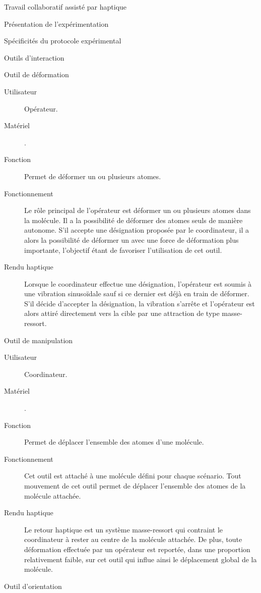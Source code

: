 \documentclass[myfrancais,ngerman,english,french]{mythesis}
\begin{document}
\begin{mychapter}{Travail collaboratif assisté par haptique}
\begin{mysection}{Présentation de l'expérimentation}
\begin{mysubsection}{Spécificités du protocole expérimental}
\begin{mysubsubsection}{Outils d'interaction}
\begin{myparagraph}{Outil de déformation}
						\begin{description}
							\item[Utilisateur] Opérateur.
							\item[Matériel] \myOmni.
							\item[Fonction] Permet de déformer un ou plusieurs atomes.
							\item[Fonctionnement]
								Le rôle principal de l'opérateur est déformer un ou plusieurs atomes dans la molécule.
								Il a la possibilité de déformer des atomes seuls de manière autonome.
								S'il accepte une désignation proposée par le coordinateur, il a alors la possibilité de déformer un  avec une force de déformation plus importante, l'objectif étant de favoriser l'utilisation de cet outil.
							\item[Rendu haptique]
								Lorsque le coordinateur effectue une désignation, l'opérateur est soumis à une vibration sinusoïdale sauf si ce dernier est déjà en train de déformer.
								S'il décide d'accepter la désignation, la vibration s'arrête et l'opérateur est alors attiré directement vers la cible par une attraction de type masse-ressort.
						\end{description}
					\end{myparagraph}
					\begin{myparagraph}{Outil de manipulation}
						\begin{description}
							\item[Utilisateur] Coordinateur.
							\item[Matériel] \myDesktop.
							\item[Fonction] Permet de déplacer l'ensemble des atomes d'une molécule.
							\item[Fonctionnement]
								Cet outil est attaché à une molécule défini pour chaque scénario.
								Tout mouvement de cet outil permet de déplacer l'ensemble des atomes de la molécule attachée.
							\item[Rendu haptique]
								Le retour haptique est un système masse-ressort qui contraint le coordinateur à rester au centre de la molécule attachée.
								De plus, toute déformation effectuée par un opérateur est reportée, dans une proportion relativement faible, sur cet outil qui influe ainsi le déplacement global de la molécule.
						\end{description}
					\end{myparagraph}
					\begin{myparagraph}{Outil d'orientation}

\end{myparagraph}
\end{mysubsubsection}
\end{mysubsection}
\end{mysection}
\end{mychapter}
\end{document}
